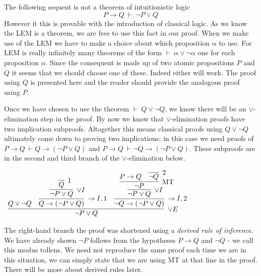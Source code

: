 \documentclass{book}
\begin{document}
    \begin{eg} 

        The following sequent is not a theorem of intuitionistic logic $$ P \to Q \ \vdash \ \lnot P \lor Q$$ However it this is provable with the introduction of classical logic. As we know the LEM is a theorem, we are free to use this fact in our proof. When we make use of the LEM we have to make a choice about which proposition $\alpha$ to use. For LEM is really infinitely many theorems of the form $\vdash \ \alpha \lor \lnot \alpha$ one for each proposition $\alpha$. Since the consequent is made up of two atomic propositions $P$ and $Q$ it seems that we should choose one of these. Indeed either will work. The proof using $Q$ is presented here and the reader should provide the analogous proof using $P$. 

        Once we have chosen to use the theorem $\vdash \ Q \lor \lnot Q$, we know there will be an $\lor$-elimination step in the proof. By now we know that $\lor$-elimination proofs have two implication subproofs. Altogether this means classical proofs using $Q \lor \lnot Q$ ultimately come down to proving two implications; in this case we need proofs of $P \to Q \ \vdash Q \to (\lnot P \lor Q)$ and $P \to Q \ \vdash \lnot Q \to (\lnot P \lor Q)$. These subproofs are in the second and third branch of the $\lor$-elimination below. 

        \begin{center}
            $\begin{array}{c}
                \infer[\lor E]{\lnot P \lor Q}
                    {Q \lor \lnot Q
                    &
                    \infer[\to I,1]{Q \to (\lnot P \lor Q)}
                        {\infer[\lor I]{\lnot P \lor Q}
                            {\infer[1]{Q}
                                {}}}
                    &
                    \infer[\to I,2]{\lnot Q \to (\lnot P \lor Q)}
                        {\infer[\lor I]{\lnot P \lor Q}
                            {\infer[\MT]{\lnot P} 
                                {P \to Q
                                &
                                \infer[2]{\lnot Q}{}}}}}
            \end{array}$
        \end{center}
        
        The right-hand branch the proof was shortened using a \emph{derived rule of inference}. We have already shown $\lnot P$ follows from the hypotheses $P \to Q$ and $\lnot Q$ - we call this modus tollens. We need not reproduce the same proof each time we are in this situation, we can simply state that we are using MT at that line in the proof. There will be more about derived rules later. 

    \end{eg}
\end{document}
